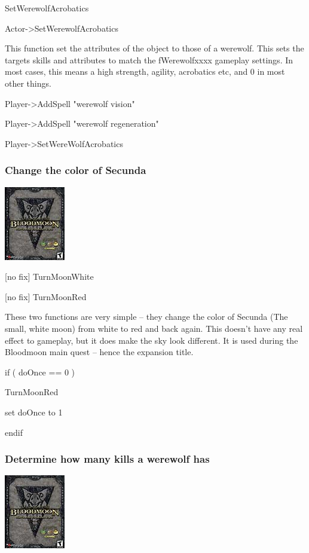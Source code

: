 \documentclass[
]{article}
\begin{document}
SetWerewolfAcrobatics

Actor-\textgreater SetWerewolfAcrobatics

This function set the attributes of the object to those of a werewolf.
This sets the targets skills and attributes to match the fWerewolfxxxx
gameplay settings. In most cases, this means a high strength, agility,
acrobatics etc, and 0 in most other things.

Player-\textgreater AddSpell "werewolf vision"

Player-\textgreater AddSpell "werewolf regeneration"

Player-\textgreater SetWereWolfAcrobatics

\hypertarget{change-the-color-of-secunda}{%
\subsubsection{Change the color of
Secunda}\label{change-the-color-of-secunda}}

\includegraphics{media/image7.png}

{[}no fix{]} TurnMoonWhite

{[}no fix{]} TurnMoonRed

These two functions are very simple -- they change the color of Secunda
(The small, white moon) from white to red and back again. This doesn't
have any real effect to gameplay, but it does make the sky look
different. It is used during the Bloodmoon main quest -- hence the
expansion title.

if ( doOnce == 0 )

TurnMoonRed

set doOnce to 1

endif

\hypertarget{determine-how-many-kills-a-werewolf-has}{%
\subsubsection{Determine how many kills a werewolf
has}\label{determine-how-many-kills-a-werewolf-has}}

\includegraphics{media/image7.png}
\end{document}
